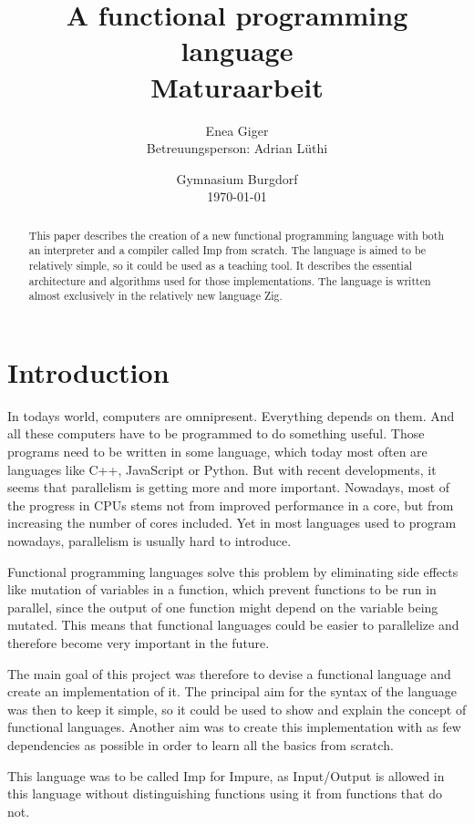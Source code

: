\documentclass[12pt]{article}
\title{A functional programming language\\Maturaarbeit}
\author{Enea Giger\\Betreuungsperson: Adrian Lüthi}
\date{Gymnasium Burgdorf\\\today}
\begin{document}
\maketitle
\newpage

\begin{abstract}
	This paper describes the creation of a new functional programming language
	with both an interpreter and a compiler called Imp from scratch.
	The language is aimed to be relatively simple, so it could be used as a
	teaching tool.
	It describes the essential architecture and algorithms used for those
	implementations.
	The language is written almost exclusively in the relatively new language
	Zig.
\end{abstract}

\tableofcontents
\newpage

\section{Introduction}
In todays world, computers are omnipresent. Everything depends on them.
And all these computers have to be programmed to do something useful.
Those programs need to be written in some language, which today most
often are languages like C++, JavaScript or Python.
But with recent developments, it seems that parallelism is getting more
and more important. Nowadays, most of the progress in CPUs stems not from
improved performance in a core, but from increasing the number of cores included.
Yet in most languages used to program nowadays, parallelism is usually hard to introduce.

Functional programming languages solve this problem by eliminating side effects
like mutation of variables in a function, which prevent functions to be run in
parallel, since the output of one function might depend on the variable being mutated.
This means that functional languages could be easier to parallelize and therefore
become very important in the future.

The main goal of this project was therefore to devise a functional language
and create an implementation of it.
The principal aim for the syntax of the language was then to keep it simple,
so it could be used to show and explain the concept of functional languages.
Another aim was to create this implementation with as few dependencies as possible
in order to learn all the basics from scratch.

This language was to be called Imp for Impure, as Input/Output is allowed in this language
without distinguishing functions using it from functions that do not.
\end{document}
